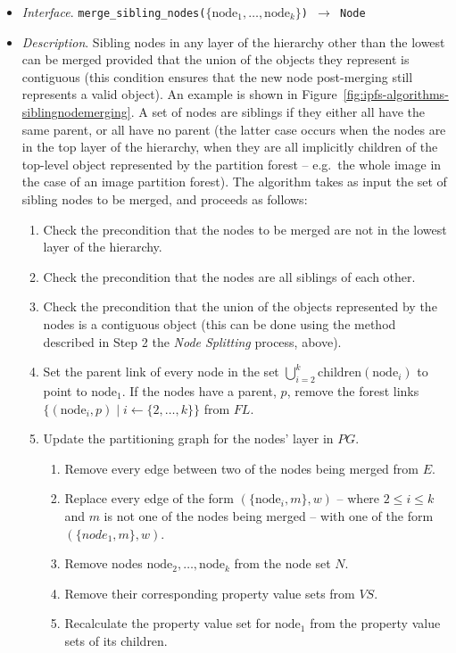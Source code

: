 \begin{itemize}

\item \emph{Interface}. \texttt{merge_sibling_nodes($\{\mbox{node}_1,\ldots,\mbox{node}_k\}$) $\rightarrow$ Node}

\item \emph{Description}. Sibling nodes in any layer of the hierarchy other than the lowest can be merged provided that the union of the objects they represent is contiguous (this condition ensures that the new node post-merging still represents a valid object). An example is shown in Figure~\ref{fig:ipfs-algorithms-siblingnodemerging}. A set of nodes are siblings if they either all have the same parent, or all have no parent (the latter case occurs when the nodes are in the top layer of the hierarchy, when they are all implicitly children of the top-level object represented by the partition forest -- e.g.~the whole image in the case of an image partition forest). The algorithm takes as input the set of sibling nodes to be merged, and proceeds as follows:

\begin{enumerate}

\item Check the precondition that the nodes to be merged are not in the lowest layer of the hierarchy.

\item Check the precondition that the nodes are all siblings of each other.

\item Check the precondition that the union of the objects represented by the nodes is a contiguous object (this can be done using the method described in Step 2 the \emph{Node Splitting} process, above).

\item Set the parent link of every node in the set $\bigcup_{i=2}^k \mbox{children}(\mbox{node}_i)$ to point to $\mbox{node}_1$. If the nodes have a parent, $p$, remove the forest links $\{(\mbox{node}_i, p) \; | \; i \leftarrow \{2,\ldots,k\}\}$ from $\textit{FL}$.

\item Update the partitioning graph for the nodes' layer in $\textit{PG}$.

\begin{enumerate}

\item Remove every edge between two of the nodes being merged from $E$.
\item Replace every edge of the form $(\{\mbox{node}_i, m\}, w)$ -- where $2 \le i \le k$ and $m$ is not one of the nodes being merged -- with one of the form $(\{node_1, m\}, w)$.
\item Remove nodes $\mbox{node}_2,\ldots,\mbox{node}_k$ from the node set $N$.
\item Remove their corresponding property value sets from $\textit{VS}$.
\item Recalculate the property value set for $\mbox{node}_1$ from the property value sets of its children.


\end{enumerate}
\end{enumerate}
\end{itemize}

